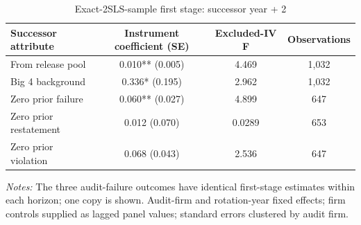 \begin{table}[htbp]
\footnotesize
\centering
\caption{Exact-2SLS-sample first stage: successor year + 2}
\begin{threeparttable}
\begin{tabular}{p{}ccc}
\toprule
Successor attribute & Instrument coefficient (SE) & Excluded-IV F & Observations \\
\midrule
From release pool & 0.010** (0.005) & 4.469 & 1,032 \\
Big 4 background & 0.336* (0.195) & 2.962 & 1,032 \\
Zero prior failure & 0.060** (0.027) & 4.899 & 647 \\
Zero prior restatement & 0.012 (0.070) & 0.0289 & 653 \\
Zero prior violation & 0.068 (0.043) & 2.536 & 647 \\
\bottomrule
\end{tabular}
\begin{tablenotes}\footnotesize
\item \raggedright \textit{Notes:} The three audit-failure outcomes have identical first-stage estimates within each horizon; one copy is shown. Audit-firm and rotation-year fixed effects; firm controls supplied as lagged panel values; standard errors clustered by audit firm.
\end{tablenotes}
\end{threeparttable}
\end{table}
